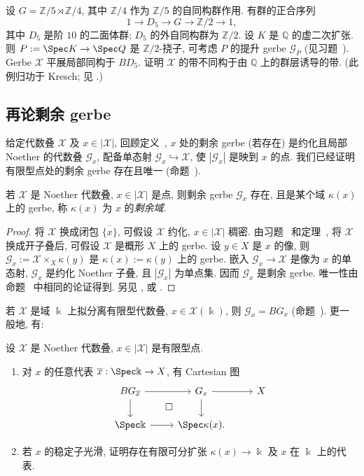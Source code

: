 \begin{exercise}\label{src:7.4.38}
设 $G=\mathbb Z/5\rtimes\mathbb Z/4$, 其中 $\mathbb Z/4$ 作为 $\mathbb Z/5$ 的自同构群作用. 有群的正合序列
\[
1\longrightarrow D_5\longrightarrow G\longrightarrow\mathbb Z/2\longrightarrow1,
\]
其中 $D_5$ 是阶 $10$ 的二面体群; $D_5$ 的外自同构群为 $\mathbb Z/2$. 设 $K$ 是 $\mathbb Q$ 的虚二次扩张. 则 $P:=\Spec K\to\Spec\mathbb Q$ 是 $\mathbb Z/2$-挠子, 可考虑 $P$ 的提升 gerbe $\mathcal G_P$ (见习题~). Gerbe $\mathcal X$ 平展局部同构于 $BD_5$. 证明 $\mathcal X$ 的带不同构于由 $\mathbb Q$ 上的群层诱导的带. (此例归功于 Kresch; 见 \cite[注记 3.2]{JL21}.)
\end{exercise}
\subsection{再论剩余 gerbe}\label{src:7.4.5-subsection}
给定代数叠 $\mathcal X$ 及 $x\in|\mathcal X|$, 回顾定义~, $x$ 处的剩余 gerbe (若存在) 是约化且局部 Noether 的代数叠 $\mathcal G_x$, 配备单态射 $\mathcal G_x\hookrightarrow\mathcal X$, 使 $|\mathcal G_x|$ 是映到 $x$ 的点. 我们已经证明有限型点处的剩余 gerbe 存在且唯一 (命题~).
\begin{proposition}\label{src:7.4.39}
若 $\mathcal X$ 是 Noether 代数叠, $x\in|\mathcal X|$ 是点, 则剩余 gerbe $\mathcal G_x$ 存在, 且是某个域 $\kappa(x)$ 上的 gerbe, 称 $\kappa(x)$ 为 $x$ 的\emph{剩余域}.
\end{proposition}
\begin{proof}
将 $\mathcal X$ 换成闭包 $\overline{\{x\}}$, 可假设 $\mathcal X$ 约化, $x\in|\mathcal X|$ 稠密. 由习题~ 和定理~, 将 $\mathcal X$ 换成开子叠后, 可假设 $\mathcal X$ 是概形 $X$ 上的 gerbe. 设 $y\in X$ 是 $x$ 的像, 则 $\mathcal G_x:=\mathcal X\times_X\kappa(y)$ 是 $\kappa(x):=\kappa(y)$ 上的 gerbe. 嵌入 $\mathcal G_x\to\mathcal X$ 是像为 $x$ 的单态射, $\mathcal G_x$ 是约化 Noether 子叠, 且 $|\mathcal G_x|$ 为单点集. 因而 $\mathcal G_x$ 是剩余 gerbe. 唯一性由命题~ 中相同的论证得到. 另见 \cite[定理 11.3]{LMB00}, \cite[定理 B.2]{Ryd11} 或 \cite[Tag 06UH]{SP}.
\end{proof}
若 $\mathcal X$ 是域 $\Bbbk$ 上拟分离有限型代数叠, $x\in\mathcal X(\Bbbk)$, 则 $\mathcal G_x=BG_x$ (命题~). 更一般地, 有:
\begin{exercise}\label{src:7.4.40}
设 $\mathcal X$ 是 Noether 代数叠, $x\in|\mathcal X|$ 是有限型点.
\begin{enumerate}[(1)]
\item 对 $x$ 的任意代表 $\overline x:\Spec\Bbbk\to\mathcal X$, 有 Cartesian 图
\[
\begin{tikzcd}[ampersand replacement=\&]
BG_{\overline x}\arrow[r]\arrow[d]\&\mathcal G_x\arrow[r]\arrow[d]\&\mathcal X\\
\Spec\Bbbk\arrow[r]\arrow[ur,phantom,"{\square}"]\&\Spec\kappa(x).\&
\end{tikzcd}
\]
\item 若 $x$ 的稳定子光滑, 证明存在有限可分扩张 $\kappa(x)\to\Bbbk$ 及 $x$ 在 $\Bbbk$ 上的代表.
\end{enumerate}
\end{exercise}
